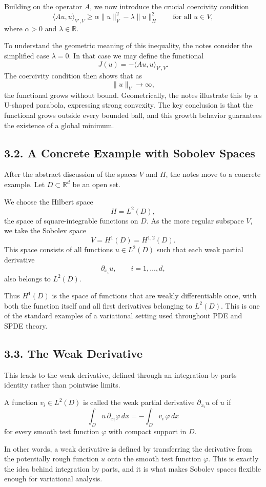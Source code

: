 \documentclass[11pt]{article}
\theoremstyle{definition}
\theoremstyle{remark}
\begin{document}
Building on the operator \(A\), we now introduce the crucial coercivity condition
\[
\langle Au,u\rangle_{V',V}\ge \alpha\|u\|_V^2-\lambda\|u\|_H^2
\qquad
\text{for all } u\in V,
\]
where \(\alpha>0\) and \(\lambda\in\mathbb R\).

To understand the geometric meaning of this inequality, the notes consider the simplified case \(\lambda=0\). In that case we may define the functional
\[
J(u)=-\langle Au,u\rangle_{V',V}.
\]
The coercivity condition then shows that as
\[
\|u\|_V\to \infty,
\]
the functional grows without bound. Geometrically, the notes illustrate this by a U-shaped parabola, expressing strong convexity. The key conclusion is that the functional grows outside every bounded ball, and this growth behavior guarantees the existence of a global minimum.

\subsection*{3.2. A Concrete Example with Sobolev Spaces}
After the abstract discussion of the spaces \(V\) and \(H\), the notes move to a concrete example. Let \(D\subset \mathbb R^d\) be an open set.

We choose the Hilbert space
\[
H=L^2(D),
\]
the space of square-integrable functions on \(D\). As the more regular subspace \(V\), we take the Sobolev space
\[
V=H^1(D)=H^{1,2}(D).
\]
This space consists of all functions \(u\in L^2(D)\) such that each weak partial derivative
\[
\partial_{x_i}u,\qquad i=1,\dots,d,
\]
also belongs to \(L^2(D)\).

Thus \(H^1(D)\) is the space of functions that are weakly differentiable once, with both the function itself and all first derivatives belonging to \(L^2(D)\). This is one of the standard examples of a variational setting used throughout PDE and SPDE theory.

\subsection*{3.3. The Weak Derivative}
This leads to the weak derivative, defined through an integration-by-parts identity rather than pointwise limits.

A function \(v_i\in L^2(D)\) is called the weak partial derivative \(\partial_{x_i}u\) of \(u\) if
\[
\int_D u\,\partial_{x_i}\varphi\,dx
=
-\int_D v_i\,\varphi\,dx
\]
for every smooth test function \(\varphi\) with compact support in \(D\).

In other words, a weak derivative is defined by transferring the derivative from the potentially rough function \(u\) onto the smooth test function \(\varphi\). This is exactly the idea behind integration by parts, and it is what makes Sobolev spaces flexible enough for variational analysis.
\end{document}
